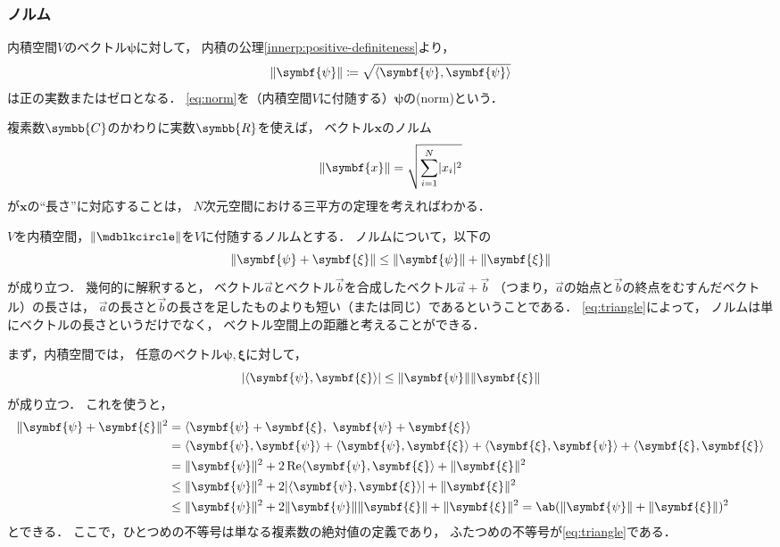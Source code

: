 \documentclass[
]{sotsu}
\newcommand{\bpsi}{\symbf{\psi}}
\newcommand{\bxi}{\symbf{\xi}}
\begin{document}
\subsubsection{ノルム}
\label{sec:norm}

内積空間$V$のベクトル$\bpsi$に対して，
内積の公理\cref{innerp:positive-definiteness}より，
\begin{equation}
    \label{eq:norm}
    \norm{\bpsi} \coloneq \sqrt{\vphantom{\bpsi}\smash{\iparen{\bpsi, \bpsi}}}
\end{equation}
は正の実数またはゼロとなる．
\cref{eq:norm}を（内積空間$V$に付随する）$\bpsi$の(norm)という．

複素数$\symbb{C}$のかわりに実数$\symbb{R}$を使えば，
ベクトル$\symbf{x}$のノルム
\begin{equation*}
    \norm{\symbf{x}} = \sqrt{\sum_{i = 1}^{N} \abs{x_i}^2}
\end{equation*}
が$\symbf{x}$の``長さ''に対応することは，
$N$次元空間における三平方の定理を考えればわかる．

$V$を内積空間，$\norm{\bigdot}$を$V$に付随するノルムとする．
ノルムについて，以下の
\begin{equation}
    \label{eq:triangle}
    \norm{\bpsi + \bxi}
    \leq \norm{\bpsi} + \norm{\bxi}
\end{equation}
が成り立つ．
幾何的に解釈すると，
ベクトル$\vec{a}$とベクトル$\vec{b}$を合成したベクトル$\vec{a} + \vec{b}$
（つまり，$\vec{a}$の始点と$\vec{b}$の終点をむすんだベクトル）の長さは，
$\vec{a}$の長さと$\vec{b}$の長さを足したものよりも短い（または同じ）であるということである．
\cref{eq:triangle}によって，
ノルムは単にベクトルの長さというだけでなく，
ベクトル空間上の距離と考えることができる．

まず，内積空間では，
任意のベクトル$\bpsi, \bxi$に対して，
\begin{equation}
    \label{eq:Cauchy-Schwarz}
    \abs{\iparen{\bpsi, \bxi}} \leq \norm{\bpsi} \norm{\bxi}
\end{equation}
が成り立つ．
これを使うと，
\begin{equation*}
    \begin{split}
        \norm{\bpsi + \bxi}^2
        &= \iparen{\bpsi + \bxi, \  \bpsi + \bxi}
        \\
        &= \iparen{\bpsi, \bpsi}
            + \iparen{\bpsi, \bxi}
            + \iparen{\bxi, \bpsi}
            + \iparen{\bxi, \bxi}
        \\
        &= \norm{\bpsi}^2
            + 2 \Real \iparen{\bpsi, \bxi}
            + \norm{\bxi}^2
        \\
        &\leq \norm{\bpsi}^2 + 2 \abs{ \iparen{\bpsi, \bxi} } + \norm{\bxi}^2
        \\
        &\leq \norm{\bpsi}^2 + 2 \norm{\bpsi} \norm{\bxi} + \norm{\bxi}^2
        = \ab(\norm{\bpsi} + \norm{\bxi})^2
    \end{split}
\end{equation*}
とできる．
ここで，ひとつめの不等号は単なる複素数の絶対値の定義であり，
ふたつめの不等号が\cref{eq:triangle}である．
\end{document}

